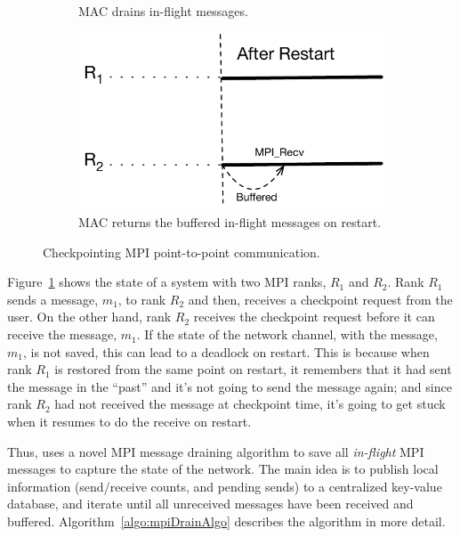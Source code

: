 \documentclass[11pt,letter]{article}
\newcommand{\sol}{MAC}
\begin{document}
\begin{figure}[t!]
\begin{subfigure}[t]{0.20\textwidth}
    \caption{\sol{} drains in-flight messages.}
  \end{subfigure}\hfill%
  \begin{subfigure}[t]{0.20\textwidth}
    \includegraphics[scale=0.38]{figures/mpiDrainAlgo4}
    \caption{\sol{} returns the buffered in-flight messages on restart.}
  \end{subfigure}
  \caption{Checkpointing MPI point-to-point communication.\label{fig:inFlightMsgs}}
\end{figure}

Figure~\ref{fig:inFlightMsgs} shows the state of a system with two MPI ranks,
$R_1$ and $R_2$. Rank $R_1$ sends a message, $m_1$, to rank $R_2$ and then,
receives a checkpoint request from the user. On the other hand, rank $R_2$
receives the checkpoint request before it can receive the message, $m_1$.
If the state of the network channel, with the message, $m_1$, is not saved,
this can lead to a deadlock on restart. This is because when rank $R_1$ is
restored from the same point on restart, it remembers that it had sent
the message in the ``past'' and it's not going to send the message again;
and since rank $R_2$ had not received the message at checkpoint time, it's
going to get stuck when it resumes to do the receive on restart.


Thus, \mpiSol{} uses a novel MPI message draining algorithm to save all
{\em in-flight} MPI messages to capture the state of the network. The main
idea is to publish local information (send/receive counts, and pending
sends) to a centralized key-value database, and iterate until all unreceived
messages have been received and buffered. Algorithm~\ref{algo:mpiDrainAlgo}
describes the algorithm in more detail.
\end{document}
